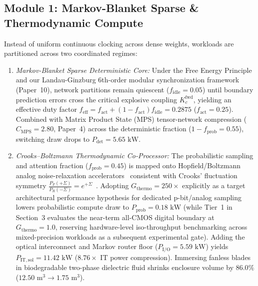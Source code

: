 \documentclass[10pt,twocolumn,a4paper]{article}
\begin{document}
\subsection{Module 1: Markov-Blanket Sparse \& Thermodynamic Compute}
Instead of uniform continuous clocking across dense weights, workloads are partitioned across two coordinated regimes:
\begin{enumerate}
\item \textit{Markov-Blanket Sparse Deterministic Core:} Under the Free Energy Principle~\cite{friston2019} and our Landau-Ginzburg 6th-order modular synchronization framework (Paper~10), network partitions remain quiescent ($f_{\mathrm{idle}} = 0.05$) until boundary prediction errors cross the critical explosive coupling $K_c^{\mathrm{fwd}}$, yielding an effective duty factor $f_{\mathrm{eff}} = f_{\mathrm{act}} + (1 - f_{\mathrm{act}})f_{\mathrm{idle}} = 0.2875$ ($f_{\mathrm{act}} = 0.25$). Combined with Matrix Product State (MPS) tensor-network compression ($C_{\mathrm{MPS}} = 2.80$, Paper~4) across the deterministic fraction ($1 - f_{\mathrm{prob}} = 0.55$), switching draw drops to $P_{\mathrm{det}} = 5.65\text{ kW}$.
\item \textit{Crooks--Boltzmann Thermodynamic Co-Processor:} The probabilistic sampling and attention fraction ($f_{\mathrm{prob}} = 0.45$) is mapped onto Hopfield/Boltzmann analog noise-relaxation accelerators~\cite{hopfield1982} consistent with Crooks' fluctuation symmetry $\frac{P_F(+\Sigma)}{P_R(-\Sigma)} = e^{+\Sigma}$~\cite{crooks1999}. Adopting $G_{\mathrm{thermo}} = 250\times$ explicitly as a target architectural performance hypothesis for dedicated p-bit/analog sampling lowers probabilistic compute draw to $P_{\mathrm{prob}} = 0.18\text{ kW}$ (while Tier~1 in Section~3 evaluates the near-term all-CMOS digital boundary at $G_{\mathrm{thermo}} = 1.0$, reserving hardware-level iso-throughput benchmarking across mixed-precision workloads as a subsequent experimental gate). Adding the optical interconnect and Markov router floor ($P_{\mathrm{I/O}} = 5.59\text{ kW}$) yields $P_{\mathrm{IT,sol}} = 11.42\text{ kW}$ ($8.76\times$ IT power compression). Immersing fanless blades in biodegradable two-phase dielectric fluid shrinks enclosure volume by $86.0\%$ ($12.50\text{ m}^3 \to 1.75\text{ m}^3$).
\end{enumerate}
\end{document}
